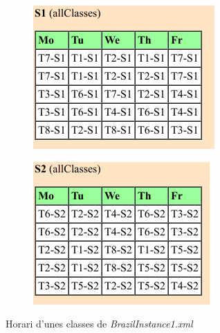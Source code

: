 \documentclass[11pt,a4paper,twoside]{report}
\begin{document}
  \begin{figure}[H]
    \centering
    \begin{subfigure}[b]{0.45\linewidth}
      \includegraphics[width=\linewidth]{Diagrames/brazil1_class.png}
    \end{subfigure}
    \begin{subfigure}[b]{0.45\linewidth}
      \includegraphics[width=\linewidth]{Diagrames/brazil1_class2.png}
    \end{subfigure}
    \caption{Horari d'unes classes de \textit{BrazilInstance1.xml}}
    \label{fig:bi1_class}
  \end{figure}
\end{document}
